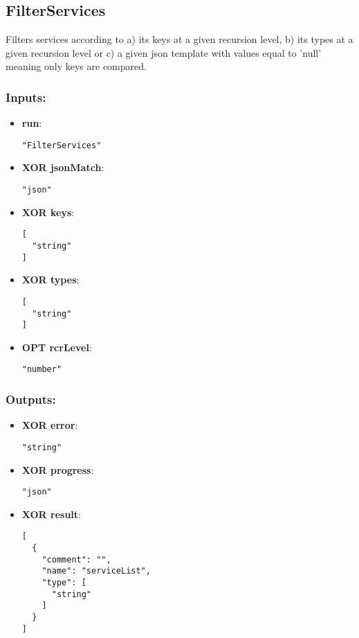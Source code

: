 \subsection{FilterServices}
Filters
 services according to a) its keys at a given recursion level, b) its 
types at a given recursion level or c) a given json template with values
 equal to 'null' meaning only keys are compared.
\subsubsection*{Inputs:}
\begin{itemize}
    \item \textbf{run}: 
\begin{lstlisting}
"FilterServices"
\end{lstlisting}
    \item \textbf{XOR jsonMatch}: 
\begin{lstlisting}
"json"
\end{lstlisting}
    \item \textbf{XOR keys}: 
\begin{lstlisting}
[
  "string"
]
\end{lstlisting}
    \item \textbf{XOR types}: 
\begin{lstlisting}
[
  "string"
]
\end{lstlisting}
    \item \textbf{OPT rcrLevel}: 
\begin{lstlisting}
"number"
\end{lstlisting}
  \end{itemize}

\subsubsection*{Outputs:}
\begin{itemize}
    \item \textbf{XOR error}: 
\begin{lstlisting}
"string"
\end{lstlisting}
    \item \textbf{XOR progress}: 
\begin{lstlisting}
"json"
\end{lstlisting}
    \item \textbf{XOR result}: 
\begin{lstlisting}
[
  {
    "comment": "", 
    "name": "serviceList", 
    "type": [
      "string"
    ]
  }
]
\end{lstlisting}
  \end{itemize}

